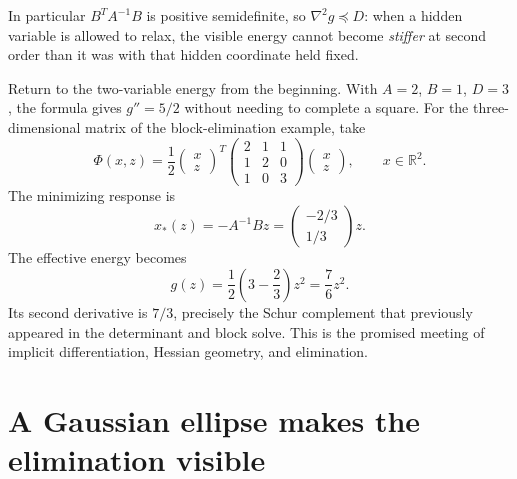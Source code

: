 In particular $B^TA^{-1}B$ is positive semidefinite, so $\nabla^2g\preceq D$: when a hidden variable is allowed to relax, the visible energy cannot become \emph{stiffer} at second order than it was with that hidden coordinate held fixed.

Return to the two-variable energy from the beginning. With $A=2$, $B=1$, $D=3$, the formula gives $g''=5/2$ without needing to complete a square. For the three-dimensional matrix of the block-elimination example, take
\[
 \Phi(x,z)=\frac12
 \begin{pmatrix}x\\z\end{pmatrix}^{\!T}
 \begin{pmatrix}2&1&1\\1&2&0\\1&0&3\end{pmatrix}
 \begin{pmatrix}x\\z\end{pmatrix},
 \qquad x\in\mathbb R^2.
\]
The minimizing response is
\[
 x_*(z)=-A^{-1}Bz=
 \begin{pmatrix}-2/3\\1/3\end{pmatrix}z.
\]
The effective energy becomes
\[
 g(z)=\frac12\left(3-\frac23\right)z^2
     =\frac76 z^2.
\]
Its second derivative is $7/3$, precisely the Schur complement that previously appeared in the determinant and block solve. This is the promised meeting of implicit differentiation, Hessian geometry, and elimination.

\section{A Gaussian ellipse makes the elimination visible}

